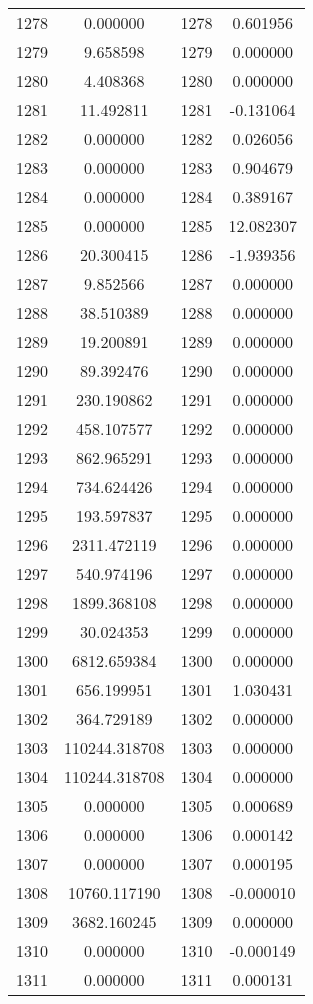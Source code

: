 \documentclass[12pt]{article}
\begin{document}
\begin{longtable}{@{}cccc@{}}
1278 & 0.000000 & 1278 & 0.601956 \\
1279 & 9.658598 & 1279 & 0.000000 \\
1280 & 4.408368 & 1280 & 0.000000 \\
1281 & 11.492811 & 1281 & -0.131064 \\
1282 & 0.000000 & 1282 & 0.026056 \\
1283 & 0.000000 & 1283 & 0.904679 \\
1284 & 0.000000 & 1284 & 0.389167 \\
1285 & 0.000000 & 1285 & 12.082307 \\
1286 & 20.300415 & 1286 & -1.939356 \\
1287 & 9.852566 & 1287 & 0.000000 \\
1288 & 38.510389 & 1288 & 0.000000 \\
1289 & 19.200891 & 1289 & 0.000000 \\
1290 & 89.392476 & 1290 & 0.000000 \\
1291 & 230.190862 & 1291 & 0.000000 \\
1292 & 458.107577 & 1292 & 0.000000 \\
1293 & 862.965291 & 1293 & 0.000000 \\
1294 & 734.624426 & 1294 & 0.000000 \\
1295 & 193.597837 & 1295 & 0.000000 \\
1296 & 2311.472119 & 1296 & 0.000000 \\
1297 & 540.974196 & 1297 & 0.000000 \\
1298 & 1899.368108 & 1298 & 0.000000 \\
1299 & 30.024353 & 1299 & 0.000000 \\
1300 & 6812.659384 & 1300 & 0.000000 \\
1301 & 656.199951 & 1301 & 1.030431 \\
1302 & 364.729189 & 1302 & 0.000000 \\
1303 & 110244.318708 & 1303 & 0.000000 \\
1304 & 110244.318708 & 1304 & 0.000000 \\
1305 & 0.000000 & 1305 & 0.000689 \\
1306 & 0.000000 & 1306 & 0.000142 \\
1307 & 0.000000 & 1307 & 0.000195 \\
1308 & 10760.117190 & 1308 & -0.000010 \\
1309 & 3682.160245 & 1309 & 0.000000 \\
1310 & 0.000000 & 1310 & -0.000149 \\
1311 & 0.000000 & 1311 & 0.000131 \\

\end{longtable}
\end{document}
